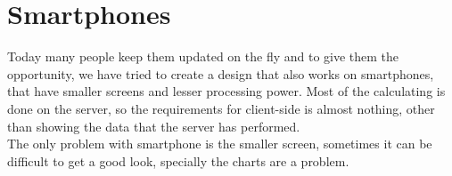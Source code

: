 \chapter{Smartphones}
Today many people keep them updated on the fly and to give them the opportunity, we have tried to create a design that also works on smartphones, that have smaller screens and lesser processing power. Most of the calculating is done on the server, so the requirements for client-side is almost nothing, other than showing the data that the server has performed.\\
The only problem with smartphone is the smaller screen, sometimes it can be difficult to get a good look, specially the charts are a problem.